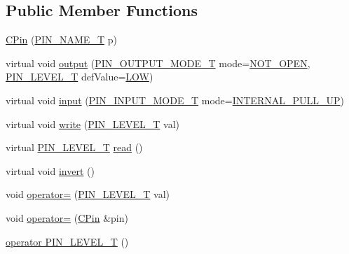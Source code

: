 \subsection*{Public Member Functions}
\begin{DoxyCompactItemize}
\item 
\hyperlink{class_c_pin_a7338f2960b4d8992c43f3c6067742ded}{C\-Pin} (\hyperlink{group___enumerations_ga65a2241721e4acb573e0c3fe29ac432f}{P\-I\-N\-\_\-\-N\-A\-M\-E\-\_\-\-T} p)
\item 
virtual void \hyperlink{class_c_pin_a84cd9c4613a9b53f00e52c23b4eed050}{output} (\hyperlink{group___enumerations_gac16e35b75166ad7286b8bb78bd244ed2}{P\-I\-N\-\_\-\-O\-U\-T\-P\-U\-T\-\_\-\-M\-O\-D\-E\-\_\-\-T} mode=\hyperlink{group___enumerations_ggac16e35b75166ad7286b8bb78bd244ed2afd68b1a66f2a33ce77d4f6c7f8fc998a}{N\-O\-T\-\_\-\-O\-P\-E\-N}, \hyperlink{group___enumerations_ga6f24594071a026b31238ab8cb80d6a80}{P\-I\-N\-\_\-\-L\-E\-V\-E\-L\-\_\-\-T} def\-Value=\hyperlink{group___enumerations_gga6f24594071a026b31238ab8cb80d6a80a6a226f4143ca3b18999551694cdb72a8}{L\-O\-W})
\item 
virtual void \hyperlink{class_c_pin_a21aa5b473c1a3637a487c7724f8b9fcf}{input} (\hyperlink{group___enumerations_ga9f8f32709b482732d6e377ff26da36ef}{P\-I\-N\-\_\-\-I\-N\-P\-U\-T\-\_\-\-M\-O\-D\-E\-\_\-\-T} mode=\hyperlink{group___enumerations_gga9f8f32709b482732d6e377ff26da36efa781a7f23ae9b0dbdc6edfdcfd3be75df}{I\-N\-T\-E\-R\-N\-A\-L\-\_\-\-P\-U\-L\-L\-\_\-\-U\-P})
\item 
virtual void \hyperlink{class_c_pin_a1fc3486f4afea4de56ae677c20600551}{write} (\hyperlink{group___enumerations_ga6f24594071a026b31238ab8cb80d6a80}{P\-I\-N\-\_\-\-L\-E\-V\-E\-L\-\_\-\-T} val)
\item 
virtual \hyperlink{group___enumerations_ga6f24594071a026b31238ab8cb80d6a80}{P\-I\-N\-\_\-\-L\-E\-V\-E\-L\-\_\-\-T} \hyperlink{class_c_pin_a02060b0c9bbf0f75dead7bef1c75ce6b}{read} ()
\item 
virtual void \hyperlink{class_c_pin_a240de24c726724aeda90bfacf1d50cc5}{invert} ()
\item 
void \hyperlink{class_c_pin_a7d125bef83689d0f1db13b3f1acbd05e}{operator=} (\hyperlink{group___enumerations_ga6f24594071a026b31238ab8cb80d6a80}{P\-I\-N\-\_\-\-L\-E\-V\-E\-L\-\_\-\-T} val)
\item 
void \hyperlink{class_c_pin_a01428eca1b98e2e194bd0848b3eb8904}{operator=} (\hyperlink{class_c_pin}{C\-Pin} \&pin)
\item 
\hyperlink{class_c_pin_a9037649d1e88192f5fde46b810c71299}{operator P\-I\-N\-\_\-\-L\-E\-V\-E\-L\-\_\-\-T} ()

\end{DoxyCompactItemize}
